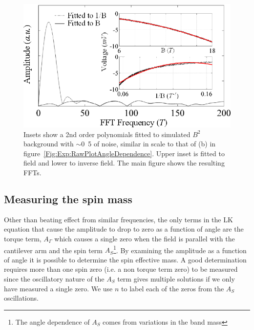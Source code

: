 \begin{figure}[h!]
    \begin{center}
        \includegraphics[scale=1.1]{Chapter-ExperimentalTechnique/Figures/ComparisonBackgroundSubtraction/ComparisonBackgroundSubtraction}
        \caption{Insets show a 2nd order polynomials fitted to simulated $B^2$ background with $\sim$\unit{0.5}{\milli\volt} of noise, similar in scale to that of (b) in figure~\ref{Fig:Exp:RawPlotAngleDependence}. Upper inset is fitted to field and lower to inverse field. The main figure shows the resulting \acp{FFT}.}
        \label{Fig:Exp:BackgroundSubtraction}
    \end{center}
\end{figure}

\subsection{Measuring the spin mass}
\label{Sec:Exp:MeasuringSpinMass}

Other than beating effect from similar frequencies, the only terms in the \ac{LK} equation that cause the amplitude to drop to zero as a function of angle are the torque term, $A_\Gamma$ which causes a single zero when the field is parallel with the cantilever arm and the spin term $A_S$\footnote{The angle dependence of $A_S$ comes from variations in the band mass}. By examining the amplitude as a function of angle it is possible to determine the spin effective mass. A good determination requires more than one spin zero (i.e. a non torque term zero) to be measured since the oscillatory nature of the $A_S$ term gives multiple solutions if we only have measured a single zero. We use $n$ to label each of the zeros from the $A_S$ oscillations.


